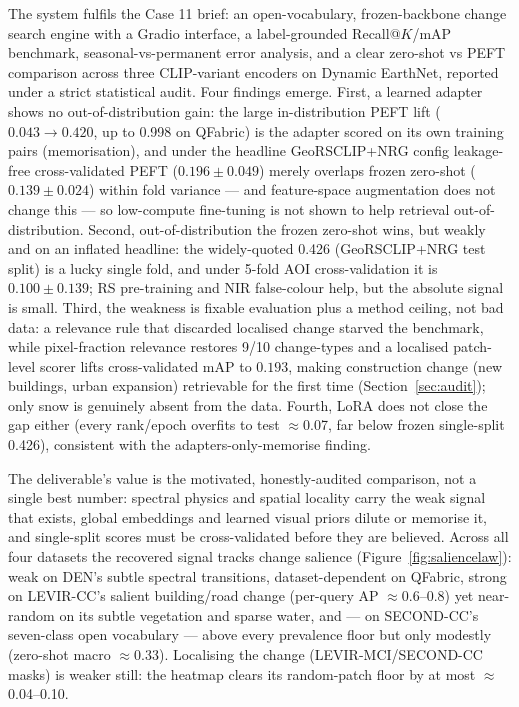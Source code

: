 \documentclass{article}
\begin{document}
The system fulfils the Case 11 brief: an open-vocabulary, frozen-backbone change
search engine with a Gradio interface, a label-grounded Recall@$K$/mAP
benchmark, seasonal-vs-permanent error analysis, and a clear zero-shot vs PEFT
comparison across three CLIP-variant encoders on Dynamic EarthNet, reported under
a strict statistical audit. Four findings emerge. First, a learned adapter shows
no out-of-distribution gain: the large in-distribution PEFT lift
($0.043 \rightarrow 0.420$, up to 0.998 on QFabric) is the adapter scored on its
own training pairs (memorisation), and under the headline GeoRSCLIP+NRG config
leakage-free cross-validated PEFT ($0.196 \pm 0.049$) merely overlaps frozen
zero-shot ($0.139 \pm 0.024$) within fold variance --- and feature-space
augmentation does not change this --- so low-compute fine-tuning is not shown to
help retrieval out-of-distribution. Second, out-of-distribution the frozen zero-shot wins, but
weakly and on an inflated headline: the widely-quoted 0.426 (GeoRSCLIP+NRG test
split) is a lucky single fold, and under 5-fold AOI cross-validation it is
$0.100 \pm 0.139$; RS pre-training and NIR false-colour help, but the absolute
signal is small. Third, the weakness is fixable evaluation plus a method ceiling,
not bad data: a relevance rule that discarded localised change starved the
benchmark, while pixel-fraction relevance restores 9/10 change-types and a
localised patch-level scorer lifts cross-validated mAP to $0.193$, making
construction change (new buildings, urban expansion) retrievable for the first
time (Section~\ref{sec:audit}); only snow is genuinely absent from the data. Fourth,
LoRA does not close the gap either (every rank/epoch overfits to test $\approx$0.07, far below frozen single-split 0.426),
consistent with the adapters-only-memorise finding.

The deliverable's value is the motivated, honestly-audited comparison, not
a single best number: spectral physics and spatial locality carry the
weak signal that exists, global embeddings and learned visual priors dilute or
memorise it, and single-split scores must be cross-validated before they are
believed. Across all four datasets the recovered signal tracks change salience
(Figure~\ref{fig:saliencelaw}):
weak on DEN's subtle spectral transitions, dataset-dependent on QFabric, strong on
LEVIR-CC's salient building/road change (per-query AP $\approx$0.6--0.8) yet
near-random on its subtle vegetation and sparse water, and --- on SECOND-CC's
seven-class open vocabulary --- above every prevalence floor but only modestly
(zero-shot macro $\approx$0.33). Localising the change (LEVIR-MCI/SECOND-CC masks)
is weaker still: the heatmap clears its random-patch floor by at most
$\approx$0.04--0.10.
\end{document}

